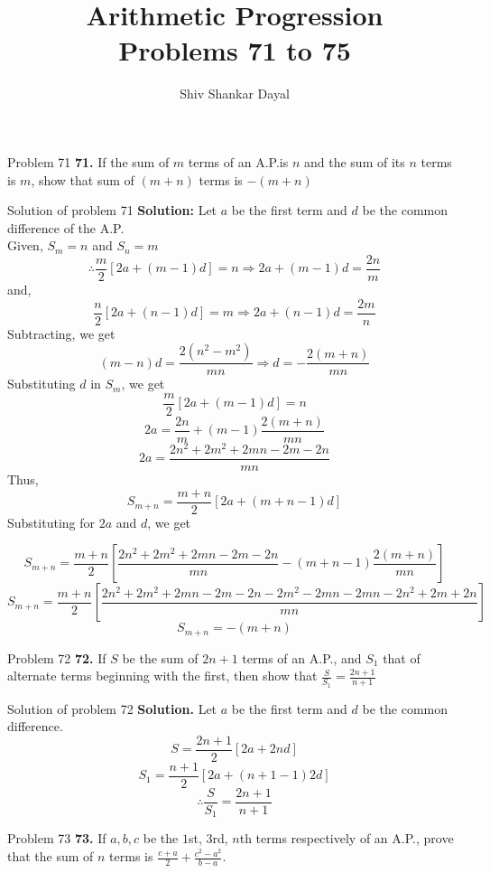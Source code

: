 \documentclass[aspectratio=169,8pt]{beamer}
\title{Arithmetic Progression\\Problems 71 to 75}
\author[Shiv Shankar Dayal]{Shiv Shankar Dayal}
\begin{document}
\begin{frame}
       \titlepage
\end{frame}
\begin{frame}{Problem 71}
  \textbf{71.} If the sum of $m$ terms of an A.P.is $n$ and the sum of its $n$
  terms is $m$, show that sum of $(m + n)$ terms is $-(m + n)$
\end{frame}
\begin{frame}{Solution of problem 71}
  \textbf{Solution:} Let $a$ be the first term and $d$ be the common difference
  of the A.P.\\
  Given, $S_m = n$ and $S_n = m$\\
  $$\therefore \frac{m}{2}[2a + (m - 1)d] = n\Rightarrow 2a + (m - 1)d = \frac{2n}{m}$$
  and, $$\frac{n}{2}[2a +(n - 1)d] = m \Rightarrow 2a + (n - 1)d = \frac{2m}{n}$$
  Subtracting, we get $$(m - n)d = \frac{2(n^2 - m^2)}{mn} \Rightarrow d =
  -\frac{2(m + n)}{mn}$$
  Substituting $d$ in $S_m$, we get $$\frac{m}{2}[2a + (m - 1)d] = n$$
  $$2a = \frac{2n}{m} + (m - 1)\frac{2(m + n)}{mn}$$
  $$2a = \frac{2n^2 + 2m^2 + 2mn -2m -2n}{mn}$$
  Thus,
  $$S_{m + n} = \frac{m + n}{2}[2a + (m + n - 1)d]$$
  Substituting for $2a$ and $d$, we get
\end{frame}
\begin{frame}
  $$S_{m + n} = \frac{m + n}{2}\left[\frac{2n^2 + 2m^2 + 2mn -2m -2n}{mn} - (m + n -
    1)\frac{2(m + n)}{mn}\right]$$
  $$S_{m + n} = \frac{m + n}{2}\left[\frac{2n^2 + 2m^2 + 2mn -2m -2n -2m^2 -2mn -2mn
      -2n^2 + 2m + 2n}{mn}\right]$$
  $$S_{m + n} = -(m + n)$$
\end{frame}
\begin{frame}{Problem 72}
  \textbf{72.} If $S$ be the sum of $2n + 1$ terms of an A.P., and $S_1$ that
  of alternate terms beginning with the first, then show that $\frac{S}{S_1} =
  \frac{2n + 1}{n + 1}$
\end{frame}
\begin{frame}{Solution of problem 72}
  \textbf{Solution.} Let $a$ be the first term and $d$ be the common
  difference.\\
  $$S = \frac{2n + 1}{2}[2a + 2nd]$$
  $$S_1 = \frac{n + 1}{2}[2a + (n + 1 - 1)2d]$$
  $$\therefore \frac{S}{S_1} = \frac{2n + 1}{n + 1}$$
\end{frame}
\begin{frame}{Problem 73}
  \textbf{73.} If $a, b, c$ be the $1$st, $3$rd, $n$th terms respectively of an
  A.P., prove that the sum of $n$ terms is $\frac{c + a}{2} + \frac{c^2 - a^2}{b
  - a}$.
\end{frame}
\end{document}
